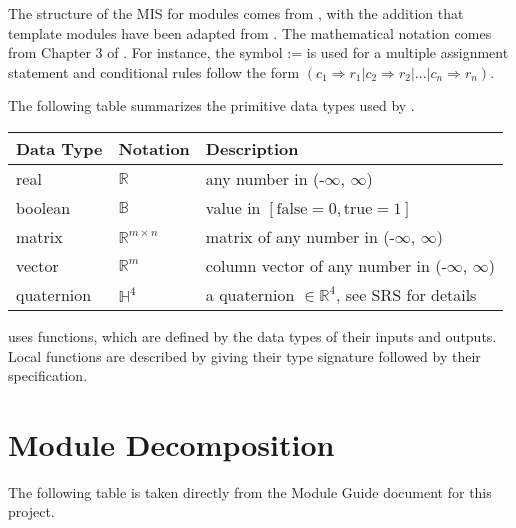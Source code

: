 \documentclass[12pt, titlepage]{article}
\begin{document}

The structure of the MIS for modules comes from \citet{HoffmanAndStrooper1995}, with the addition
that template modules have been adapted from \cite{GhezziEtAl2003}.  The mathematical notation comes
from Chapter 3 of \citet{HoffmanAndStrooper1995}.  For instance, the symbol := is used for a
multiple assignment statement and conditional rules follow the form $(c_1 \Rightarrow r_1 | c_2
\Rightarrow r_2 | ... | c_n \Rightarrow r_n )$.

The following table summarizes the primitive data types used by \progname.

\begin{center}
\renewcommand{\arraystretch}{1.2}
\noindent
\begin{tabular}{l l p{7.5cm}}
\toprule
\textbf{Data Type} & \textbf{Notation} & \textbf{Description}\\
\midrule
real & $\mathbb{R}$ & any number in (-$\infty$, $\infty$)\\
boolean & $\mathbb{B}$ & value in $[\text{false}=0, \text{true}=1]$\\
matrix & $\mathbb{R}^{m \times n}$ & matrix of any number in (-$\infty$, $\infty$)\\
vector & $\mathbb{R}^{m}$ & column vector of any number in (-$\infty$, $\infty$)\\
quaternion & $\mathbb{H}^4$ & a quaternion $\in \mathbb{R}^4$, see SRS for details\\
\bottomrule
\end{tabular}
\end{center}

\noindent
\progname{} uses functions, which are defined by the data types of their inputs and outputs. Local
functions are described by giving their type signature followed by their specification.

\section{Module Decomposition}

The following table is taken directly from the Module Guide document for this project.
\end{document}
